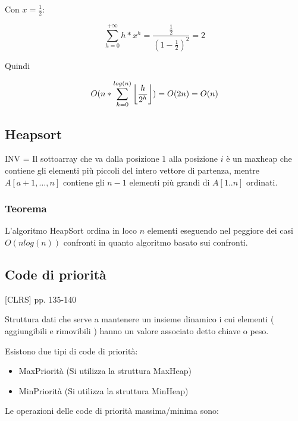 \documentclass[tikz]{article}
\DeclarePairedDelimiter\floor{\lfloor}{\rfloor}
\providecommand{\tightlist}{%
  \setlength{\itemsep}{0pt}\setlength{\parskip}{0pt}}
\begin{document}
{{Con $x=\frac{1}{2}$:}

\begin{equation}
\sum_{h=0}^{+\infty}{h*x^h} = \frac{\frac{1}{2}}{{(1-\frac{1}{2})}^2} = 2
\end{equation}

{Quindi}

\begin{equation}
O(n*\sum_{h=0}^{log(n)}{\floor*{\frac{h}{2^h}}}) = O(2n) = O(n)
\end{equation}

\subsection{Heapsort}



{INV = Il sottoarray che va dalla posizione $1$ alla posizione $i$ è un maxheap che contiene gli elementi più piccoli del intero vettore di partenza, mentre $A[a+1,\ldots,n]$ contiene gli $n-1$ elementi più grandi di $A[1..n]$ ordinati}{.}

\subsubsection{Teorema}

{L'algoritmo HeapSort ordina in loco $n$ elementi eseguendo nel peggiore dei casi $O(nlog(n))$ confronti in quanto algoritmo basato sui confronti.}

\hypertarget{h.jih9riph7gns}{\subsection{\texorpdfstring{{Code di
priorità}}{Code di priorità}}\label{h.jih9riph7gns}}

{{[}CLRS{]} pp. 135-140}

{Struttura dati che serve a mantenere un insieme dinamico i cui elementi ( aggiungibili e rimovibili ) hanno un valore associato detto chiave o peso.}

{Esistono due tipi di code di priorità:}

\begin{itemize}
\tightlist
\item
  {MaxPriorità (Si utilizza la struttura MaxHeap)}
\item
  {MinPriorità (Si utilizza la struttura MinHeap)}
\end{itemize}

{Le operazioni delle code di priorità massima/minima sono:}

}
\end{document}
